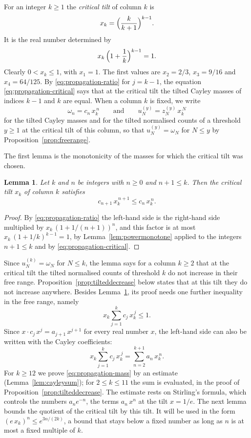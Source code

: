 \documentclass{amsart}
\newtheorem{lemma}[theorem]{Lemma}
\theoremstyle{definition}
\theoremstyle{remark}
\numberwithin{equation}{section}
\begin{document}
For an integer $k\ge1$ the \emph{critical tilt} of column $k$ is
\[
x_k=\Bigl(\frac{k}{k+1}\Bigr)^{k-1} .
\]
It is the real number determined by
\begin{equation}\label{eq:propagation-critical}
x_k\,\Bigl(1+\frac1k\Bigr)^{k-1}=1 .
\end{equation}
Clearly $0<x_k\le1$, with $x_1=1$. The first values
are $x_2=2/3$, $x_3=9/16$ and $x_4=64/125$. By \eqref{eq:propagation-ratio}
for $j=k-1$, the equation \eqref{eq:propagation-critical} says that
at the critical tilt the tilted Cayley
masses of indices $k-1$ and $k$ are equal. When a column $k$ is fixed, we
write
\[
\omega_n=c_n\,x_k^{\,n}\qquad\text{and}\qquad u^{(y)}_N=z^{(y)}_N\,x_k^{\,N}
\]
for the tilted Cayley masses and for the tilted normalised counts of a
threshold $y\ge1$ at the critical tilt of this column, so that
$u^{(y)}_N=\omega_N$ for $N\le y$ by Proposition~\ref{prop:freerange}.

The first lemma is the monotonicity of the masses for which the critical tilt
was chosen.

\begin{lemma}\label{lem:massesdecrease}
Let $k$ and $n$ be integers with $n\ge0$ and $n+1\le k$. Then the critical
tilt $x_k$ of column $k$ satisfies
\[
c_{n+1}\,x_k^{\,n+1}\le c_n\,x_k^{\,n} .
\]
\end{lemma}

\begin{proof}
By \eqref{eq:propagation-ratio} the left-hand side is the right-hand side
multiplied by $x_k\,(1+1/(n+1))^{n}$, and this factor is at most
$x_k\,(1+1/k)^{k-1}=1$, by Lemma~\ref{lem:powermonotone} applied to the
integers $n+1\le k$ and by \eqref{eq:propagation-critical}.
\end{proof}

Since $u^{(k)}_N=\omega_N$ for $N\le k$, the lemma says for a column
$k\ge2$ that at the critical tilt the tilted normalised counts
of threshold $k$ do not increase in their free range.
Proposition~\ref{prop:tilteddecrease} below states that at this tilt they do
not increase anywhere. Besides Lemma~\ref{lem:massesdecrease}, its proof
needs one further inequality in the free range, namely
\begin{equation}\label{eq:propagation-mass}
x_k\sum_{j=1}^{k}c_j\,x_k^{\,j}\le1 .
\end{equation}
Since $x\cdot c_j\,x^j=a_{j+1}\,x^{j+1}$ for every real number $x$, the
left-hand side can also be written with the Cayley coefficients:
\begin{equation}\label{eq:propagation-cayley}
x_k\sum_{j=1}^{k}c_j\,x_k^{\,j}=\sum_{n=2}^{k+1}a_n\,x_k^{\,n} .
\end{equation}
For $k\ge12$ we prove
\eqref{eq:propagation-mass} by an estimate (Lemma~\ref{lem:cayleysum}); for
$2\le k\le11$ the sum is evaluated, in the proof of
Proposition~\ref{prop:tilteddecrease}. The estimate rests on Stirling's
formula, which controls the numbers $a_ne^{-n}$, the terms $a_n\,x^n$ at
the tilt $x=1/e$. The next lemma bounds the quotient of the critical tilt by
this tilt. It will be used in the form $(e\,x_k)^n\le e^{3n/(2k)}$, a bound
that stays below a fixed number as long as $n$ is at most a fixed multiple
of $k$.
\end{document}
